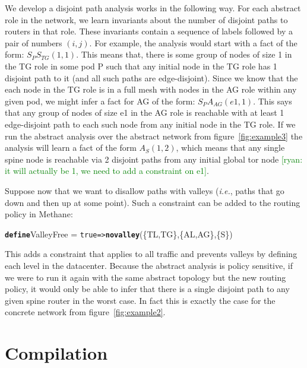 \documentclass{sig-alternate-10pt}
\newcommand{\ryan}[1]{\textcolor{green}{[ryan: #1]}}
\newcommand{\IE}{\emph{i.e.}}
\newcommand{\sysname}{{\small \sf Methane}\xspace}
\newcommand{\CD}[1]{\texttt{\small #1}}  %
\newcommand{\KW}[1]{\texttt{\small\bfseries{#1}}}
\newcommand{\True}{\CD{true}}
\newcommand{\Define}{\KW{define}}
\newcommand{\Path}{\texttt{=>}}
\newcommand{\Novalley}{\KW{novalley}}
\begin{document}
We develop a disjoint path analysis works in the following way. For each abstract role in the network, we learn invariants about the number of disjoint paths to routers in that role. These invariants contain a sequence of labels followed by a pair of numbers $(i,j)$. For example, the analysis would start with a fact of the form: $S_P S_{TG} (1,1)$. This means that, there is some group of nodes of size 1 in the TG role in some pod P such that any initial node in the TG role has 1 disjoint path to it (and all such paths are edge-disjoint). Since we know that the each node in the TG role is in a full mesh with nodes in the AG role within any given pod, we might infer a fact for AG of the form: $S_P A_{AG}(e1,1)$. This says that any group of nodes of size e1 in the AG role is reachable with at least 1 edge-disjoint path to each such node from any initial node in the TG role.
%
If we run the abstract analysis over the abstract network from figure~\ref{fig:example3} the analysis will learn a fact of the form $A_{S}(1,2)$, which means that any single spine node is reachable via 2 disjoint paths from any initial global tor node \ryan{it will actually be 1, we need to add a constraint on e1}. 

Suppose now that we want to disallow paths with valleys (\IE, paths that go down and then up at some point). Such a constraint can be added to the routing policy in \sysname:
\begin{code}
\Define ValleyFree =
    \True \Path \Novalley(\{TL,TG\},\{AL,AG\},\{S\})
\end{code}
\noindent%

This adds a constraint that applies to all traffic and prevents valleys by defining each level in the datacenter.
Because the abstract analysis is policy sensitive, if we were to run it again with the same abstract topology but the new routing policy, it would only be able to infer that there is a single disjoint path to any given spine router in the worst case. In fact this is exactly the case for the concrete network from figure~\ref{fig:example2}.  

%
%
%


%
%
%
%

\section{Compilation}
\label{sec:compilation}
\end{document}
